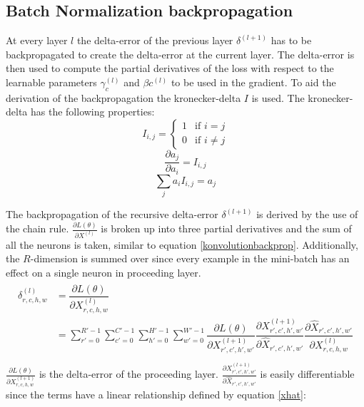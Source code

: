 \documentclass[a4paper, twoside]{article}
\newcommand*{\pd}[2]{\ensuremath{\dfrac{\partial #1}{\partial #2}}}
\newcommand*{\inpd}[2]{\ensuremath{\frac{\partial #1}{\partial #2}}}
\begin{document}
\subsection{Batch Normalization backpropagation}
At every layer $l$ the delta-error of the previous layer $\delta^{(l+1)}$ has to be backpropagated to create the delta-error at the current layer. The delta-error is then used to compute the partial derivatives of the loss with respect to the learnable parameters $\gamma_{c}^{(l)}$ and $\beta{c}^{(l)}$ to be used in the gradient. To aid the derivation of the backpropagation the kronecker-delta $I$ is used. The kronecker-delta has the following properties: \cite{webBN1} \cite{webBN2}
\begin{equation}\label{kroneckerdelta}
I_{i,j} = \begin{cases} 1 & \mbox{if } i = j \\ 0 & \mbox{if } i \neq j  \end{cases}
\end{equation}
\begin{equation}\label{kroneckerdeltaDERIVATIVE}
\pd{a_{j}}{a_i} = I_{i,j}
\end{equation}
\begin{equation}\label{kroneckerdeltaSUM}
\sum_j  a_i  I_{i,j} = a_j
\end{equation}

The backpropagation of the recursive delta-error $\delta^{(l+1)}$ is derived by the use of the chain rule. $\inpd{L(\theta)}{X^{(l)}}$ is broken up into three partial derivatives and the sum of all the neurons is taken, similar to equation \eqref{konvolutionbackprop}. Additionally, the $R$-dimension is summed over since every example in the mini-batch has an effect on a single neuron in proceeding layer. \cite{webBN1} \cite{webBN2}
\begin{align}\label{BN_delta_error}
\begin{split}
	\delta^{(l)}_{r,c,h,w}
		& = \pd{L(\theta)}{X^{(l)}_{r,c,h,w}} \\
		& = \sum^{R'-1}_{r'=0} \sum^{C'-1}_{c'=0} \sum^{H'-1}_{h'=0} \sum^{W'-1}_{w'=0} \pd{L(\theta)}{X^{(l+1)}_{r',c',h',w'}} \pd{X^{(l+1)}_{r',c',h',w'}}{\hat{X}_{r',c',h',w'}} \pd{\hat{X}_{r',c',h',w'}}{{X}^{(l)}_{r,c,h,w}}\\
\end{split}
\end{align}
$\inpd{L(\theta)}{X^{(l+1)}_{r,c,h,w}}$ is the delta-error of the proceeding layer. $\inpd{X^{(l+1)}_{r',c',h',w'}}{\hat{X}_{r',c',h',w'}}$ is easily differentiable since the terms have a linear relationship defined by equation \eqref{xhat}: \cite{webBN1} \cite{webBN2}
\end{document}
